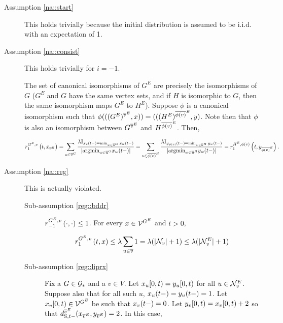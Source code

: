 \begin{description}
\item[Assumption \ref{na::start}]

This holds trivially because the initial distribution is assumed to be i.i.d. with an expectation of 1.

\item[Assumption \ref{na::consist}] This holds trivially for \(i = -1\). 

The set of canonical isomorphisms of \(G^E\) are precisely the isomorphisms of \(G\) (\(G^E\) and \(G\) have the same vertex sets, and if \(H\) is isomorphic to \(G\), then the same isomorphism maps \(G^E\) to \(H^E\)). Suppose \(\phi\) is a canonical isomorphism such that \(\phi(((G^E)^{\overline{v}^E},x)) = (((H^E)^{\overline{\phi(v)}^E},y)\). Note then that \(\phi\) is also an isomorphism between \(G^{\overline{v}^E}\) and \(H^{\overline{\phi(v)}^E}\). Then,

\[\rate\gvpara{G^E}{v}\stpara{1}\tmepro{t}{\xf\vind{\ecl{v}}}{} = \sum_{u \in \cl{v}\gind{G}} \frac{\lambda\mb{I}_{\xf\vind{v}\tme{t-} = \min_{w\in\cl{u}\gind{G}} \xf\vind{w}\tme{t-}}}{|\te{argmin}_{w\in\cl{u}\gind{G}} \xf\vind{w}\tme{t-}|} = \sum_{u \in \cl{\phi(v)}\gind{H}} \frac{\lambda\mb{I}_{\xg\vind{\phi(v)}\tme{t-} = \min_{w\in\cl{u}\gind{H}} \xg\vind{w}\tme{t-}}}{|\te{argmin}_{w\in\cl{u}\gind{H}} \xg\vind{w}\tme{t-}|} = \rate\gvpara{H^E}{\phi(v)}\stpara{1}\tmepro{t}{\xg\vind{\ecl{\phi(v)}}}{}.\]

\item[Assumption \ref{na::reg}] This is actually violated.

\begin{description}
\item[Sub-assumption \ref{reg::bddr}] \(\rate\gvpara{G^E}{v}\stpara{-1}\tmepro{\cdot}{\cdot}{} \leq 1\). For every \(x\in\mathcal{V}^{G^E}\) and \(t > 0\),

\[\rate\gvpara{G^E}{v}\stpara{1}\tmepro{t}{\xf}{} \leq \lambda\sum_{u \in \cl{v}} 1 = \lambda(|\neigh{v}|+1) \leq \lambda(|\eneigh{v}|+1)\]

\item[Sub-assumption \ref{reg::liprx}]  Fix a \(G \in \mathcal{G}_\ast\) and a \(v \in V\). Let \(x_{u}[0,t) = y_{u}[0,t)\) for all \(u \in \mathcal{N}^E_{v}\). Suppose also that for all such \(u\), \(x_{u}(t-) = y_{u}(t-) = 1\). Let \(x_{v}[0,t) \in \mathcal{V}^{G^E}\) be such that \(x_{v}(t-) = 0\). Let \(y_{v}[0,t) = x_{v}[0,t) + 2\) so that \(\stmet{t-}\vpara{\ecl{v}}(\xf\vind{\ecl{v}},\xg\vind{\ecl{v}}) = 2\). In this case,


\end{description}
\end{description}
